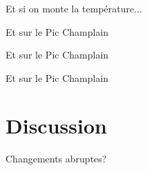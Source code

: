 \documentclass{eecslides}
\begin{document}

	\begin{frame}{Et si on monte la température...}
	\end{frame}


	\begin{frame}{Et sur le Pic Champlain}

	\end{frame}


	\begin{frame}{Et sur le Pic Champlain}
	\end{frame}


	\begin{frame}{Et sur le Pic Champlain}

	\end{frame}

\section{Discussion}

		\begin{frame}{Changements abruptes?}
		\begin{center}
		\end{center}
	\end{frame}

\end{document}
